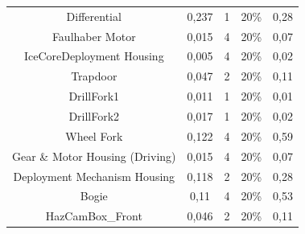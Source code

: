 \begin{table}[hbt]
{\begin{tabular}{@{}llllll@{}}
\multicolumn{2}{c}{Differential}                     & \multicolumn{1}{c}{0,237}                        & \multicolumn{1}{c}{1}        & \multicolumn{1}{c}{20\%}             & \multicolumn{1}{c}{0,28}           \\
\multicolumn{2}{c}{Faulhaber Motor}                  & \multicolumn{1}{c}{0,015}                        & \multicolumn{1}{c}{4}        & \multicolumn{1}{c}{20\%}             & \multicolumn{1}{c}{0,07}           \\
\multicolumn{2}{c}{IceCoreDeployment Housing}        & \multicolumn{1}{c}{0,005}                        & \multicolumn{1}{c}{4}        & \multicolumn{1}{c}{20\%}             & \multicolumn{1}{c}{0,02}           \\
\multicolumn{2}{c}{Trapdoor}                         & \multicolumn{1}{c}{0,047}                        & \multicolumn{1}{c}{2}        & \multicolumn{1}{c}{20\%}             & \multicolumn{1}{c}{0,11}           \\
\multicolumn{2}{c}{DrillFork1}                       & \multicolumn{1}{c}{0,011}                        & \multicolumn{1}{c}{1}        & \multicolumn{1}{c}{20\%}             & \multicolumn{1}{c}{0,01}           \\
\multicolumn{2}{c}{DrillFork2}                       & \multicolumn{1}{c}{0,017}                        & \multicolumn{1}{c}{1}        & \multicolumn{1}{c}{20\%}             & \multicolumn{1}{c}{0,02}           \\
\multicolumn{2}{c}{Wheel  Fork}                      & \multicolumn{1}{c}{0,122}                        & \multicolumn{1}{c}{4}        & \multicolumn{1}{c}{20\%}             & \multicolumn{1}{c}{0,59}           \\
\multicolumn{2}{c}{Gear  \& Motor Housing (Driving)} & \multicolumn{1}{c}{0,015}                        & \multicolumn{1}{c}{4}        & \multicolumn{1}{c}{20\%}             & \multicolumn{1}{c}{0,07}           \\
\multicolumn{2}{c}{Deployment  Mechanism Housing}    & \multicolumn{1}{c}{0,118}                        & \multicolumn{1}{c}{2}        & \multicolumn{1}{c}{20\%}             & \multicolumn{1}{c}{0,28}           \\
\multicolumn{2}{c}{Bogie}                            & \multicolumn{1}{c}{0,11}                         & \multicolumn{1}{c}{4}        & \multicolumn{1}{c}{20\%}             & \multicolumn{1}{c}{0,53}           \\
\multicolumn{2}{c}{HazCamBox\_Front}                 & \multicolumn{1}{c}{0,046}                        & \multicolumn{1}{c}{2}        & \multicolumn{1}{c}{20\%}             & \multicolumn{1}{c}{0,11}           \\

\end{tabular}}
\end{table}
